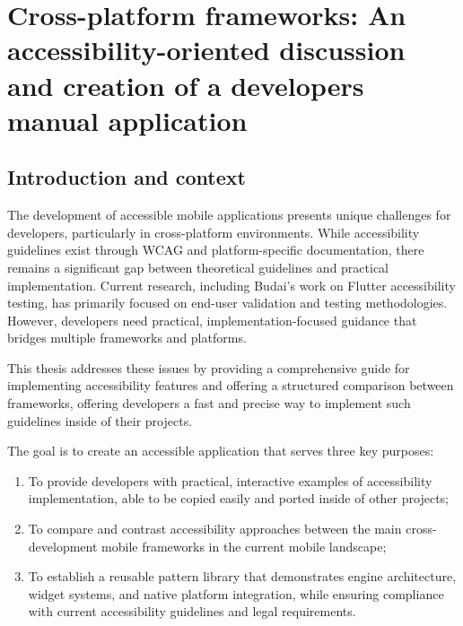 \chapter{Cross-platform frameworks: An accessibility-oriented discussion and creation of a developers manual application}
\label{chap:frameworks}


\section{Introduction and context}
\label{sec:intro-context}

The development of accessible mobile applications presents unique challenges for developers, particularly in cross-platform environments. While accessibility guidelines exist through WCAG and platform-specific documentation, there remains a significant gap between theoretical guidelines and practical implementation. Current research, including Budai's work on Flutter accessibility testing, has primarily focused on end-user validation and testing methodologies. However, developers need practical, implementation-focused guidance that bridges multiple frameworks and platforms.

This thesis addresses these issues by providing a comprehensive guide for implementing accessibility features and offering a structured comparison between frameworks, offering developers a fast and precise way to implement such guidelines inside of their projects.

The goal is to create an accessible application that serves three key purposes:
\begin{enumerate}
    \item To provide developers with practical, interactive examples of accessibility implementation, able to be copied easily and ported inside of other projects;
    \item To compare and contrast accessibility approaches between the main cross-development mobile frameworks in the current mobile landscape;
    \item To establish a reusable pattern library that demonstrates engine architecture, widget systems, and native platform integration, while ensuring compliance with current accessibility guidelines and legal requirements.
\end{enumerate}

